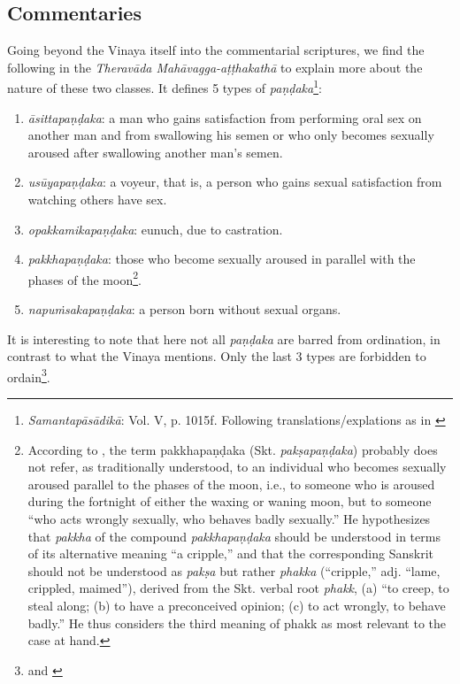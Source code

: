 \subsection{Commentaries}

Going beyond the Vinaya itself into the commentarial scriptures, we find the following in the {\em Theravāda Mahāvagga-aṭṭhakathā} to explain more about the nature of these two classes. It defines 5 types of {\em paṇḍaka}\footnote{{\em Samantapāsādikā}: Vol. V, p. 1015f. Following translations/explations as in \cite{bomhard}}:

\begin{enumerate}
\item {\em āsittapaṇḍaka}: a man who gains satisfaction from performing oral sex on another man and from swallowing his semen or who only becomes sexually aroused after swallowing another man’s semen. 
\item {\em usūyapaṇḍaka}: a voyeur, that is, a person who gains sexual satisfaction from watching others have sex. 
\item {\em opakkamikapaṇḍaka}: eunuch, due to castration.
\item {\em pakkhapaṇḍaka}: those who become sexually aroused in parallel with the phases of the moon\footnote{According to \cite{bomhard}, the term pakkhapaṇḍaka (Skt. {\em pakṣapaṇḍaka}) probably does not refer, as traditionally understood, to an individual who becomes sexually aroused parallel to the phases of the moon, i.e., to someone who is aroused during the fortnight of either the waxing or waning moon, but to someone “who acts wrongly sexually, who behaves badly sexually.” He hypothesizes that {\em pakkha} of the compound {\em pakkhapaṇḍaka} should be understood in terms of its alternative meaning “a cripple,” and that the corresponding Sanskrit should not be understood as {\em pakṣa} but rather {\em phakka} (“cripple,” adj. “lame, crippled, maimed”), derived from the Skt. verbal root {\em phakk}, (a) “to creep, to steal along; (b) to have a preconceived opinion; (c) to act wrongly, to behave badly.” He thus considers the third meaning of phakk as most relevant to the case at hand.}.
\item {\em napuṁsakapaṇḍaka}: a person born without sexual organs. 
\end{enumerate}

It is interesting to note that here not all {\em paṇḍaka} are barred from ordination, in contrast to what the Vinaya mentions. Only the last 3 types are forbidden to ordain\footnote{\cite{wong} and \cite{thanissaro}}.

